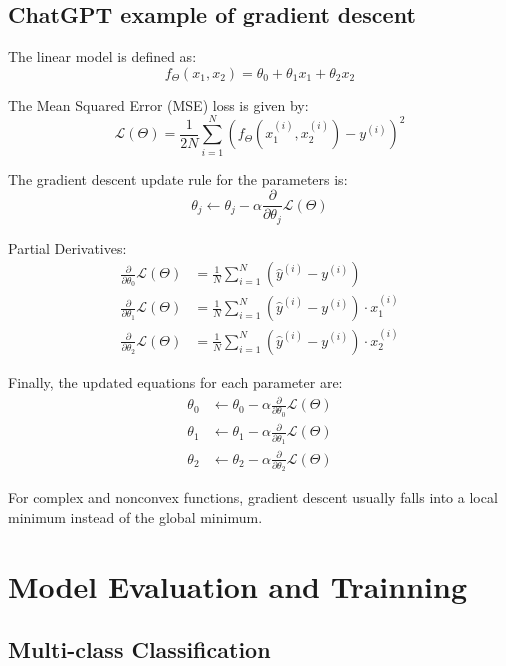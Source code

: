 \documentclass[letterpaper,12pt]{article}
\begin{document}
\subsection{ChatGPT example of gradient descent}

The linear model is defined as:
\[ f_\Theta(x_1, x_2) = \theta_0 + \theta_1 x_1 + \theta_2 x_2 \]

The Mean Squared Error (MSE) loss is given by:
\[ \mathcal{L}(\Theta) = \frac{1}{2N} \sum_{i=1}^{N} (f_\Theta(x_1^{(i)}, x_2^{(i)}) - y^{(i)})^2 \]

The gradient descent update rule for the parameters is:
\[ \theta_j \leftarrow \theta_j - \alpha \frac{\partial}{\partial \theta_j} \mathcal{L}(\Theta) \]

Partial Derivatives:
\begin{align*}
    \frac{\partial}{\partial \theta_0} \mathcal{L}(\Theta) & = \frac{1}{N} \sum_{i=1}^{N} (\hat{y}^{(i)} - y^{(i)})                 \\
    \frac{\partial}{\partial \theta_1} \mathcal{L}(\Theta) & = \frac{1}{N} \sum_{i=1}^{N} (\hat{y}^{(i)} - y^{(i)}) \cdot x_1^{(i)} \\
    \frac{\partial}{\partial \theta_2} \mathcal{L}(\Theta) & = \frac{1}{N} \sum_{i=1}^{N} (\hat{y}^{(i)} - y^{(i)}) \cdot x_2^{(i)}
\end{align*}

Finally, the updated equations for each parameter are:
\begin{align*}
    \theta_0 & \leftarrow \theta_0 - \alpha \frac{\partial}{\partial \theta_0} \mathcal{L}(\Theta) \\
    \theta_1 & \leftarrow \theta_1 - \alpha \frac{\partial}{\partial \theta_1} \mathcal{L}(\Theta) \\
    \theta_2 & \leftarrow \theta_2 - \alpha \frac{\partial}{\partial \theta_2} \mathcal{L}(\Theta)
\end{align*}

For complex and nonconvex functions, gradient descent usually falls into a
local minimum instead of the global minimum.

\section{Model Evaluation and Trainning}

\subsection{Multi-class Classification}
\end{document}
